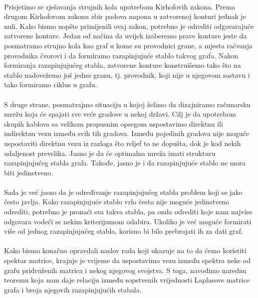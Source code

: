 \documentclass[11pt]{article}
\begin{document}
		\paragraph{}
		Prisjetimo se rješavanja strujnih kola upotrebom Kirhofovih zakona. Prema drugom Kirhofovom zakonu zbir padova napona u zatvorenoj konturi jednak je nuli. 
		Kako bismo uopšte primijenili ovaj zakon, potrebno je odrediti odgovarajuće zatvorene konture.
		Jedan od načina da uvijek izaberemo prave konture jeste da posmatramo strujno kola kao graf u kome su provodnici grane, 
		a mjesta račvanja provodnika čvorovi i da formiramo razapinjujuće stablo takvog grafa.
		Nakon formiranja razapinjujućeg stabla, zatvorene konture konstruišemo tako što na stablo nadovežemo još jednu granu,
	    tj. provodnik, koji nije u njegovom sastavu i tako formiramo ciklus u grafu.
	
		\paragraph{}
	        S druge strane, posmatrajmo situaciju u kojoj želimo da dizajniramo računarsku mrežu koja će spajati sve veće gradove u nekoj državi. 
		Cilj je da upotrebom skupih kablova sa velikom propusnim opsegom uspostavimo direktnu ili indirektnu vezu između svih tih gradova.
		Između pojedinih gradova nije moguće uspostaviti direktnu vezu iz razloga što reljef to ne dopušta, dok je kod nekih udaljenost prevelika.
		Jasno je da će optimalna mreža imati strukturu razapinjujućeg stabla grafa. Takođe, jasno je i da razapinjujuće stablo ne mora biti jedinstveno.
	
		\paragraph{}
		Sada je već jasno da je određivanje razapinjujućeg stabla problem koji se jako često javlja. Kako razapinjujuće stablo vrlo često nije moguće jedinstveno odrediti, 
		potrebno je pronaći sva takva stabla, pa onda odrediti koje nam najvise odgovara vodeći se nekim kriterijumom odabira. 
		Ukoliko je već moguće formirati više od jednog razapinjujućeg stabla, korisno bi bilo prebrojati ih za dati graf.
		
		\paragraph{}
		Kako bismo konačno opravdali naslov rada koji ukazuje na to da ćemo koristiti spektar matrice,
		krajnje je vrijeme da uspostavimo vezu između spektra neke od grafu pridruženih 	     
		matrica i nekog njegovog svojstva. 
		S toga, navodimo narednu teoremu koja nam daje relaciju između sopstvenih vrijednosti Laplasove matrice grafa i broja njegovih razapinjujućih stabala.
	
\end{document}
